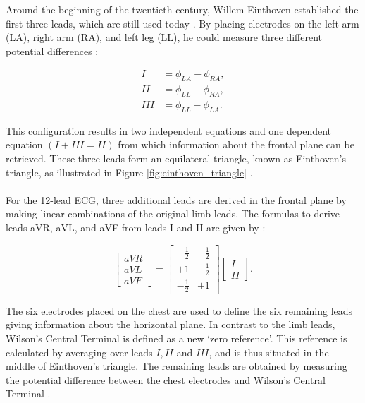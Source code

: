\noindent Around the beginning of the twentieth century, Willem Einthoven established the first three leads, which are still used today \cite{rivera-ruiz_einthovens_2008}. By placing electrodes on the left arm (LA), right arm (RA), and left leg (LL), he could measure three different potential differences \cite{keener_cardiac_1998}:

\begin{equation}
\begin{split}
I &= \phi_{LA} - \phi_{RA}, \\
II &= \phi_{LL} - \phi_{RA}, \\
III &= \phi_{LL} - \phi_{LA}.
\end{split}
\end{equation}

\noindent This configuration results in two independent equations and one dependent equation \((I + III = II)\) from which information about the frontal plane can be retrieved. These three leads form an equilateral triangle, known as Einthoven's triangle, as illustrated in Figure \ref{fig:einthoven_triangle} \cite{luna_morphology_2005}.
\\ \\
For the 12-lead ECG, three additional leads are derived in the frontal plane by making linear combinations of the original limb leads. The formulas to derive leads aVR, aVL, and aVF from leads I and II are given by \cite{luna_morphology_2005, zhang_synthesis_2021, thambawita_deepfake_2021}:

\begin{equation}
\begin{bmatrix}
    aVR \\
    aVL \\
    aVF
\end{bmatrix}
=
\begin{bmatrix}
    -\frac{1}{2} & -\frac{1}{2} \\
    +1 & -\frac{1}{2} \\
    -\frac{1}{2} & +1
\end{bmatrix}
\begin{bmatrix}
    I \\
    II
\end{bmatrix}.
\end{equation}

\noindent The six electrodes placed on the chest are used to define the six remaining leads giving information about the horizontal plane. In contrast to the limb leads, Wilson's Central Terminal is defined as a new `zero reference'. This reference is calculated by averaging over leads \(I, II\) and \(III\), and is thus situated in the middle of Einthoven's triangle. The remaining leads are obtained by measuring the potential difference between the chest electrodes and Wilson's Central Terminal \cite{m_rangayyan_biomedical_2002}.
\\ \\

